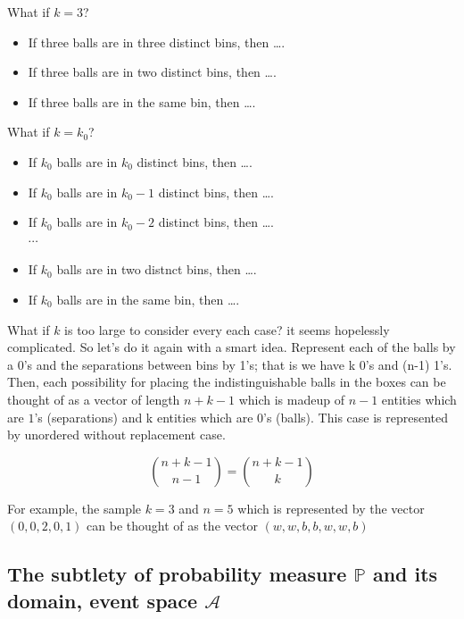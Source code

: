 \documentclass[twoside]{article}
\theoremstyle{definition}
\theoremstyle{remark}
\begin{document}
What if $k = 3$?
\begin{itemize}
  \setlength\itemsep{0.0em}
  \item If three balls are in three distinct bins, then \ldots.
  \item If three balls are in two distinct bins, then \ldots.
  \item If three balls are in the same bin, then \ldots.
\end{itemize}

What if $k = k_0$?
\begin{itemize}
  \setlength\itemsep{0.0em}
  \item If $k_0$ balls are in $k_0$ distinct bins, then \ldots.
  \item If $k_0$ balls are in $k_0 - 1$ distinct bins, then \ldots.
  \item If $k_0$ balls are in $k_0 - 2$ distinct bins, then \ldots.
  \\ $\cdots$
  \item If $k_0$ balls are in two distnct bins, then \ldots.
  \item If $k_0$ balls are in the same bin, then \ldots.
\end{itemize}

What if $k$ is too large to consider every each case? it seems hopelessly
complicated. So let's do it again with a smart idea. Represent each of the
balls by a 0's and the separations between bins by 1's; that is we have k 0's
and (n-1) 1's.
\\[1.0\baselineskip]

Then, each possibility for placing the indistinguishable balls in the boxes
can be thought of as a vector of length $n + k - 1$ which is madeup of $n-1$
entities which are $1$'s (separations) and k entities which are 0's (balls).
This case is represented by unordered without replacement case.

$$
\binom{n+k-1}{n-1} = \binom{n+k-1}{k}
$$

For example, the sample $k=3$ and $n=5$ which is represented by the vector
$(0, 0, 2, 0, 1)$ can be thought of as the vector $(w, w, b, b, w, w, b)$

\clearpage
\subsection{The subtlety of probability measure $\mathbb{P}$ and its domain, event space $\mathcal{A}$}
\end{document}
